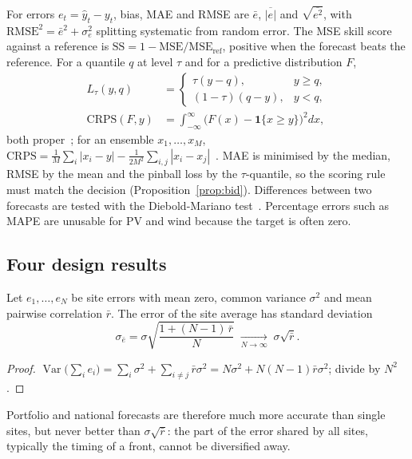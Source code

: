For errors $e_t=\hat y_t-y_t$, bias, MAE and RMSE are $\bar e$, $\overline{|e|}$ and $\sqrt{\overline{e^2}}$, with $\text{RMSE}^2=\bar e^2+\sigma_e^2$ splitting systematic from random error. The MSE skill score against a reference is $\text{SS}=1-\text{MSE}/\text{MSE}_{\text{ref}}$, positive when the forecast beats the reference. For a quantile $q$ at level $\tau$ and for a predictive distribution $F$,
\begin{align}
L_\tau(y,q)&=\begin{cases}\tau(y-q), & y\ge q,\\(1-\tau)(q-y), & y<q,\end{cases}\\
\text{CRPS}(F,y)&=\int_{-\infty}^{\infty}\big(F(x)-\mathbf 1\{x\ge y\}\big)^2dx,
\end{align}
both proper~\cite{gneiting2007scoring}; for an ensemble $x_1,\dots,x_M$, $\text{CRPS}=\frac1M\sum_i|x_i-y|-\frac1{2M^2}\sum_{i,j}|x_i-x_j|$~\cite{hersbach2000crps}. MAE is minimised by the median, RMSE by the mean and the pinball loss by the $\tau$-quantile, so the scoring rule must match the decision (Proposition~\ref{prop:bid}). Differences between two forecasts are tested with the Diebold-Mariano test~\cite{diebold1995comparing}. Percentage errors such as MAPE are unusable for PV and wind because the target is often zero.

\subsection{Four design results}

\begin{proposition}
\label{prop:smooth}
Let $e_1,\dots,e_N$ be site errors with mean zero, common variance $\sigma^2$ and mean pairwise correlation $\bar r$. The error of the site average has standard deviation
\begin{equation}
\sigma_{\bar e}=\sigma\sqrt{\frac{1+(N-1)\,\bar r}{N}}\;\xrightarrow[N\to\infty]{}\;\sigma\sqrt{\bar r}. \label{eq:smooth}
\end{equation}
\end{proposition}
\begin{proof}
$\operatorname{Var}\big(\sum_ie_i\big)=\sum_i\sigma^2+\sum_{i\ne j}\bar r\sigma^2=N\sigma^2+N(N-1)\bar r\sigma^2$; divide by $N^2$.
\end{proof}
Portfolio and national forecasts are therefore much more accurate than single sites, but never better than $\sigma\sqrt{\bar r}$: the part of the error shared by all sites, typically the timing of a front, cannot be diversified away.

